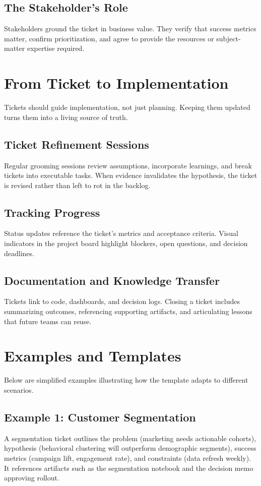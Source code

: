 \subsection{The Stakeholder's Role}
Stakeholders ground the ticket in business value. They verify that success metrics matter, confirm prioritization, and agree to provide the resources or subject-matter expertise required.

\section{From Ticket to Implementation}
\label{sec:ticket-to-implementation}

Tickets should guide implementation, not just planning. Keeping them updated turns them into a living source of truth.

\subsection{Ticket Refinement Sessions}
Regular grooming sessions review assumptions, incorporate learnings, and break tickets into executable tasks. When evidence invalidates the hypothesis, the ticket is revised rather than left to rot in the backlog.

\subsection{Tracking Progress}
Status updates reference the ticket's metrics and acceptance criteria. Visual indicators in the project board highlight blockers, open questions, and decision deadlines.

\subsection{Documentation and Knowledge Transfer}
Tickets link to code, dashboards, and decision logs. Closing a ticket includes summarizing outcomes, referencing supporting artifacts, and articulating lessons that future teams can reuse.

\section{Examples and Templates}
\label{sec:ticket-examples}

Below are simplified examples illustrating how the template adapts to different scenarios.

\subsection{Example 1: Customer Segmentation}
A segmentation ticket outlines the problem (marketing needs actionable cohorts), hypothesis (behavioral clustering will outperform demographic segments), success metrics (campaign lift, engagement rate), and constraints (data refresh weekly). It references artifacts such as the segmentation notebook and the decision memo approving rollout.

